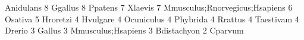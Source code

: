 \documentclass{article}
\renewenvironment{Schunk}{\vspace{\topsep}}{\vspace{\topsep}}
\begin{document}
\begin{Schunk}
\begin{Soutput}
                                                                    Anidulans 
                                                                            8 
                                                                      Ggallus 
                                                                            8 
                                                                      Ppatens 
                                                                            7 
                                                                      Xlaevis 
                                                                            7 
                                               Mmusculus;Rnorvegicus;Hsapiens 
                                                                            6 
                                                                      Osativa 
                                                                            5 
                                                                     Hroretzi 
                                                                            4 
                                                                     Hvulgare 
                                                                            4 
                                                                   Ocuniculus 
                                                                            4 
                                                                     Phybrida 
                                                                            4 
                                                                      Rrattus 
                                                                            4 
                                                                    Taestivam 
                                                                            4 
                                                                       Drerio 
                                                                            3 
                                                                       Gallus 
                                                                            3 
                                                           Mmusculus;Hsapiens 
                                                                            3 
                                                                  Bdistachyon 
                                                                            2 
                                                                      Cparvum 

\end{Soutput}
\end{Schunk}
\end{document}

